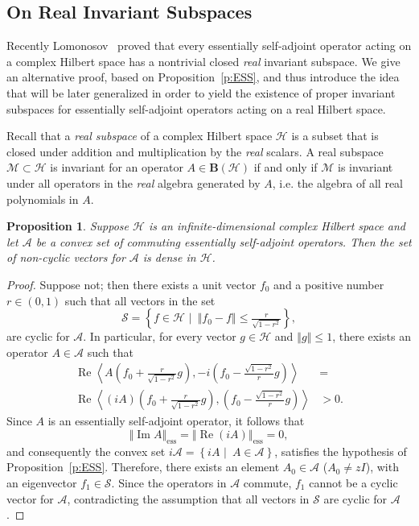 \documentclass{tran-l}
\newtheorem{prop}[thm]{Proposition}
\theoremstyle{definition}
\theoremstyle{remark}
\numberwithin{equation}{subsection}
\DeclareMathOperator{\RE}{Re}
\DeclareMathOperator{\IM}{Im}
\DeclareMathOperator{\ess}{ess}
\newcommand{\h}{\mathcal{H}}
\newcommand{\s}{\mathcal{S}}
\newcommand{\A}{\mathcal{A}}
\newcommand{\M}{\mathcal{M}}
\newcommand{\BH}{\mathbf{B}(\mathcal{H})}
\newcommand{\set}[1]{\left\{#1\right\}}
\newcommand{\seq}[1]{\left<#1\right>}
\newcommand{\norm}[1]{\left\Vert#1\right\Vert}
\newcommand{\essnorm}[1]{\norm{#1}_{\ess}}
\begin{document}
\subsection{On Real Invariant Subspaces}
Recently Lomonosov~\cite{Lom92} proved that every essentially self-adjoint operator acting on a complex Hilbert space has a nontrivial closed \emph{real} invariant subspace. We give an alternative proof, based on Proposition~\ref{p:ESS}, and thus introduce the idea that will be later generalized in order to yield the existence of proper invariant subspaces for essentially self-adjoint operators acting on a real Hilbert space.

Recall that a \emph{real subspace} of a complex Hilbert space $\h$ is a subset that is closed under addition and multiplication by the \emph{real} scalars. A real subspace $\M\subset\h$ is invariant for an operator $A\in\BH$ if and only if $\M$ is invariant under all operators in the \emph{real} algebra generated by $A$, i.e. the algebra of all real polynomials in $A$.

\begin{prop}\label{p:RIS}
Suppose $\h$ is an infinite-dimensional complex Hilbert space and let $\A$ be a convex set of commuting essentially self-adjoint operators. Then the set of non-cyclic vectors for $\A$ is dense in $\h$.
\end{prop}

\begin{proof}
Suppose not; then there exists a unit vector $f_0$ and a positive number $r\in(0,1)$ such that all vectors in the set
\[ \s=\set{f\in\h\,\,|\,\,\,\norm{f_0-f} \leq
      \tfrac{r}{\sqrt{1-r^2}}}, \]
are cyclic for $\A$. In particular, for every vector $g\in\h$ and $\norm{g}\leq1$, there exists an operator $A\in\A$ such that
\begin{align*}
  \RE\seq{A\left(f_0+\tfrac{r}{\sqrt{1-r^2}}g\right),
    -i\left(f_0-\tfrac{\sqrt{1-r^2}}{r}g\right)} & = \\
  \RE\seq{(i{A})\left(f_0+\tfrac{r}{\sqrt{1-r^2}}g\right),
    \left(f_0-\tfrac{\sqrt{1-r^2}}{r}g\right)} & > 0.
\end{align*}
Since $A$ is an essentially self-adjoint operator, it follows that
\[ \essnorm{\IM{A}}=\essnorm{\RE(i{A})}=0, \]
and consequently the convex set $i\A=\set{i{A}\,\,|\,\,\,A\in\A}$, satisfies the hypothesis of Proposition~\ref{p:ESS}. Therefore, there exists an element $A_0\in\A$ ($A_0\neq{z}I$), with an eigenvector $f_1\in\s$. Since the operators in $\A$ commute, $f_1$ cannot be a cyclic vector for $\A$, contradicting the assumption that all vectors in $\s$ are cyclic for $\A$.
\end{proof}
\end{document}
